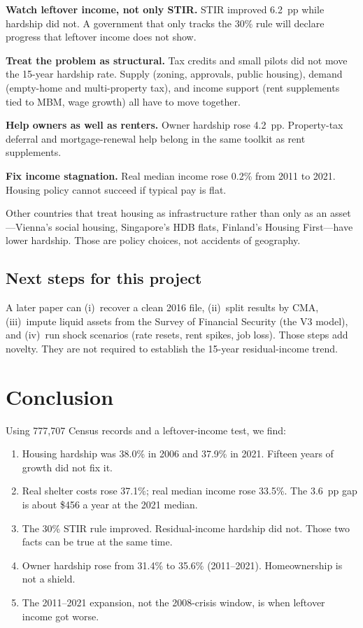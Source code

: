 \documentclass[11pt,letterpaper]{article}
\begin{document}
\textbf{Watch leftover income, not only STIR.}
STIR improved 6.2~pp while hardship did not.
A government that only tracks the 30\% rule will declare progress that leftover income does not show.

\textbf{Treat the problem as structural.}
Tax credits and small pilots did not move the 15-year hardship rate.
Supply (zoning, approvals, public housing), demand (empty-home and multi-property tax), and income support (rent supplements tied to MBM, wage growth) all have to move together.

\textbf{Help owners as well as renters.}
Owner hardship rose 4.2~pp.
Property-tax deferral and mortgage-renewal help belong in the same toolkit as rent supplements.

\textbf{Fix income stagnation.}
Real median income rose 0.2\% from 2011 to 2021.
Housing policy cannot succeed if typical pay is flat.

Other countries that treat housing as infrastructure rather than only as an asset---Vienna's social housing, Singapore's HDB flats, Finland's Housing First---have lower hardship.
Those are policy choices, not accidents of geography.

\subsection{Next steps for this project}
\label{sec:next}

A later paper can (i)~recover a clean 2016 file, (ii)~split results by CMA, (iii)~impute liquid assets from the Survey of Financial Security (the V3 model), and (iv)~run shock scenarios (rate resets, rent spikes, job loss).
Those steps add novelty.
They are not required to establish the 15-year residual-income trend.

\section{Conclusion}
\label{sec:conclusion}

Using 777,707 Census records and a leftover-income test, we find:

\begin{enumerate}[leftmargin=1.6em]
  \item Housing hardship was 38.0\% in 2006 and 37.9\% in 2021. Fifteen years of growth did not fix it.
  \item Real shelter costs rose 37.1\%; real median income rose 33.5\%. The 3.6~pp gap is about \$456 a year at the 2021 median.
  \item The 30\% STIR rule improved. Residual-income hardship did not. Those two facts can be true at the same time.
  \item Owner hardship rose from 31.4\% to 35.6\% (2011--2021). Homeownership is not a shield.
  \item The 2011--2021 expansion, not the 2008-crisis window, is when leftover income got worse.
\end{enumerate}
\end{document}
